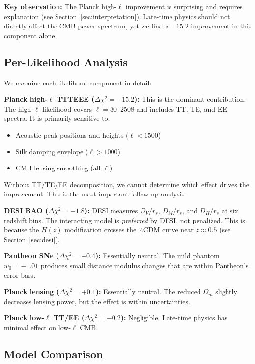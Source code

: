 \documentclass[twocolumn,showpacs,preprintnumbers,amsmath,amssymb,prd]{revtex4-2}
\begin{document}
\textbf{Key observation:} The Planck high-$\ell$ improvement is surprising and requires explanation (see Section~\ref{sec:interpretation}). Late-time physics should not directly affect the CMB power spectrum, yet we find a $-15.2$ improvement in this component alone.

\subsection{Per-Likelihood Analysis}

We examine each likelihood component in detail:

\textbf{Planck high-$\ell$ TTTEEE ($\Delta\chi^2 = -15.2$):} This is the dominant contribution. The high-$\ell$ likelihood covers $\ell = 30$--$2508$ and includes TT, TE, and EE spectra. It is primarily sensitive to:
\begin{itemize}
    \item Acoustic peak positions and heights ($\ell < 1500$)
    \item Silk damping envelope ($\ell > 1000$)
    \item CMB lensing smoothing (all $\ell$)
\end{itemize}
Without TT/TE/EE decomposition, we cannot determine which effect drives the improvement. This is the most important follow-up analysis.

\textbf{DESI BAO ($\Delta\chi^2 = -1.8$):} DESI measures $D_V/r_s$, $D_M/r_s$, and $D_H/r_s$ at six redshift bins. The interacting model is \textit{preferred} by DESI, not penalized. This is because the $H(z)$ modification crosses the $\Lambda$CDM curve near $z \approx 0.5$ (see Section~\ref{sec:desi}).

\textbf{Pantheon SNe ($\Delta\chi^2 = +0.4$):} Essentially neutral. The mild phantom $w_0 = -1.01$ produces small distance modulus changes that are within Pantheon's error bars.

\textbf{Planck lensing ($\Delta\chi^2 = +0.1$):} Essentially neutral. The reduced $\Omega_m$ slightly decreases lensing power, but the effect is within uncertainties.

\textbf{Planck low-$\ell$ TT/EE ($\Delta\chi^2 = -0.2$):} Negligible. Late-time physics has minimal effect on low-$\ell$ CMB.

\subsection{Model Comparison}
\label{sec:model_comparison}
\end{document}
